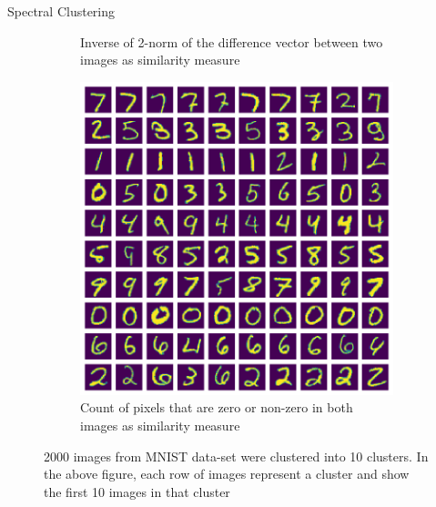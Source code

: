 \documentclass[10pt,a4paper, nocenter]{beamer}
\begin{document}
\begin{frame}{Spectral Clustering}
\begin{figure}[h]
\begin{center}
\begin{subfigure}[b]{0.3\textwidth}
					\caption{Inverse of 2-norm of the difference vector between two images as similarity measure}
					\label{fig:clustering_10_2norm}
				\end{subfigure}           
				\begin{subfigure}[b]{0.3\textwidth}
					\centering
					\includegraphics[width=\textwidth]{../../images/number_clustering_10_hamming.png}
					\caption{Count of pixels that are zero or non-zero in both images as similarity measure}
					\label{fig:clustering_10_hamming}
				\end{subfigure}           
			\end{center}
			\caption{2000 images from MNIST data-set were clustered into 10 clusters. In the above figure, each row of images represent a cluster and show the first 10 images in that cluster}
			\label{fig:mnist10ClusterImages}
		\end{figure}

	\end{frame}
\end{document}
